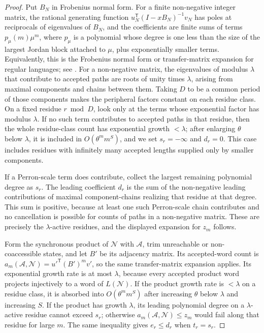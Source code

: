 \begin{proof}
  Put \(B_N\) in Frobenius normal form. For a finite non-negative
  integer matrix, the rational generating function
  \(u_N^{\mathsf T}(I-xB_N)^{-1}v_N\) has poles at reciprocals of
  eigenvalues of \(B_N\), and the coefficients are finite sums of
  terms \(p_{\mu}(m)\mu^m\), where \(p_\mu\) is a polynomial whose
  degree is one less than the size of the largest Jordan block attached
  to \(\mu\), plus exponentially smaller terms. Equivalently, this is
  the Frobenius normal form or transfer-matrix expansion for regular
  languages; see \cite{SalomaaSoittola1978,BerstelReutenauer2011}.
  For a non-negative matrix, the eigenvalues of modulus \(\lambda\)
  that contribute to accepted paths are roots of unity times
  \(\lambda\), arising from maximal components and chains between them.
  Taking \(D\) to be a common period of those components makes the
  peripheral factors constant on each residue class. On a fixed residue
  \(r\bmod D\), look only at the terms whose exponential factor has
  modulus \(\lambda\). If no such term contributes to accepted paths in
  that residue, then the whole residue-class count has exponential
  growth \(<\lambda\); after enlarging \(\theta\) below \(\lambda\), it
  is included in \(O(\theta^m m^S)\), and we set \(s_r=-\infty\) and
  \(d_r=0\). This case includes residues with infinitely many accepted
  lengths supplied only by smaller components.

  If a Perron-scale term does contribute, collect the largest remaining
  polynomial degree as \(s_r\). The leading coefficient \(d_r\) is the
  sum of the non-negative leading contributions of maximal
  component-chains realizing that residue at that degree. This sum is
  positive, because at least one such Perron-scale chain contributes
  and no cancellation is possible for counts of paths in a
  non-negative matrix. These are precisely the \(\lambda\)-active
  residues, and the displayed expansion for \(z_m\) follows.

  Form the synchronous product of \(\mathcal N\) with \(\mathcal A\),
  trim unreachable or non-coaccessible states, and let \(B'\) be its
  adjacency matrix. Its accepted-word count is
  \(a_m(\mathcal A,\mathcal N)=u'^{\mathsf T}(B')^m v'\), so the same
  transfer-matrix expansion applies. Its exponential growth rate is at
  most \(\lambda\), because every accepted product word projects
  injectively to a word of \(L(\mathcal N)\). If the product growth rate
  is \(<\lambda\) on a residue class, it is absorbed into
  \(O(\theta^m m^S)\) after increasing \(\theta\) below \(\lambda\) and
  increasing \(S\). If the product has growth \(\lambda\), its leading
  polynomial degree on a \(\lambda\)-active residue cannot exceed \(s_r\);
  otherwise \(a_m(\mathcal A,\mathcal N)\le z_m\) would fail along that
  residue for large \(m\). The same inequality gives \(e_r\le d_r\)
  when \(t_r=s_r\).


\end{proof}
